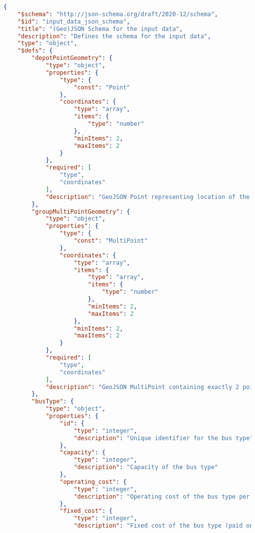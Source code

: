 \begin{lstlisting}[language=json, caption={Input GeoJSON Schema}, label={lst:jsonschema}]
{
    "$schema": "http://json-schema.org/draft/2020-12/schema",
    "$id": "input_data_json_schema",
    "title": "(Geo)JSON Schema for the input data",
    "description": "Defines the schema for the input data",
    "type": "object",
    "$defs": {
        "depotPointGeometry": {
            "type": "object",
            "properties": {
                "type": {
                    "const": "Point"
                },
                "coordinates": {
                    "type": "array",
                    "items": {
                        "type": "number"
                    },
                    "minItems": 2,
                    "maxItems": 2
                }
            },
            "required": [
                "type",
                "coordinates"
            ],
            "description": "GeoJSON Point representing location of the depot"
        },
        "groupMultiPointGeometry": {
            "type": "object",
            "properties": {
                "type": {
                    "const": "MultiPoint"
                },
                "coordinates": {
                    "type": "array",
                    "items": {
                        "type": "array",
                        "items": {
                            "type": "number"
                        },
                        "minItems": 2,
                        "maxItems": 2
                    },
                    "minItems": 2,
                    "maxItems": 2
                }
            },
            "required": [
                "type",
                "coordinates"
            ],
            "description": "GeoJSON MultiPoint containing exactly 2 points, where the first point represents the origin of the group and the second point represents the destination of the group"
        },
        "busType": {
            "type": "object",
            "properties": {
                "id": {
                    "type": "integer",
                    "description": "Unique identifier for the bus type"
                },
                "capacity": {
                    "type": "integer",
                    "description": "Capacity of the bus type"
                },
                "operating_cost": {
                    "type": "integer",
                    "description": "Operating cost of the bus type per km"
                },
                "fixed_cost": {
                    "type": "integer",
                    "description": "Fixed cost of the bus type (paid only once per bus)"

\end{lstlisting}
